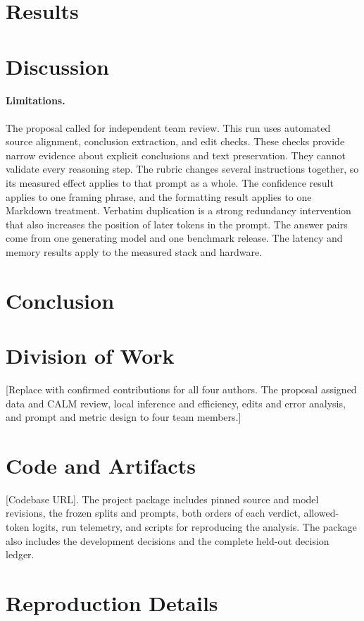 \documentclass[11pt]{article}
\begin{document}
\section{Results}


\section{Discussion}


\paragraph{Limitations.}
The proposal called for independent team review. This run uses automated
source alignment, conclusion extraction, and edit checks. These checks
provide narrow evidence about explicit conclusions and text preservation.
They cannot validate every reasoning step. The rubric changes several
instructions together, so its measured effect applies to that prompt
as a whole. The confidence result applies to one framing phrase, and the
formatting result applies to one Markdown treatment. Verbatim duplication
is a strong redundancy intervention that also increases the position of
later tokens in the prompt. The answer pairs come from one generating
model and one benchmark release. The latency and memory results apply
to the measured stack and hardware.

\section{Conclusion}


\section*{Division of Work}
[Replace with confirmed contributions for all four authors. The proposal
assigned data and CALM review, local inference and efficiency, edits and
error analysis, and prompt and metric design to four team members.]

\section*{Code and Artifacts}
[Codebase URL]. The project package includes pinned source and model
revisions, the frozen splits and prompts, both orders of each verdict,
allowed-token logits, run telemetry, and scripts for reproducing the
analysis. The package also includes the development decisions and
the complete held-out decision ledger.



\appendix
\section{Reproduction Details}

\end{document}
